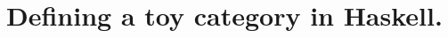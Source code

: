 \section{ Defining a toy category in Haskell. }


\inputminted[firstline=28,
             lastline=56,
             fontsize=\footnotesize, tabsize=4]{haskell}{ps1.hs}
